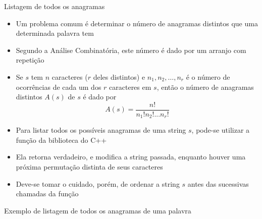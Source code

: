 \begin{frame}[fragile]{Listagem de todos os anagramas}

    \begin{itemize}
        \item Um problema comum é determinar o número de anagramas distintos que uma determinada 
            palavra tem

        \item Segundo a Análise Combinatória, este número é dado por um arranjo com repetição

        \item Se $s$ tem $n$ caracteres ($r$ deles distintos) e $n_1, n_2, \ldots, n_r$ é o número 
            de ocorrências de cada um dos $r$ caracteres em $s$, então o número de anagramas 
            distintos $A(s)$ de $s$ é dado por
            \[
                A(s) = \frac{n!}{n_1!n_2!...n_r!}
            \]

        \item Para listar todos os possíveis anagramas de uma string $s$, pode-se utilizar a 
            função  da biblioteca  do C++

        \item Ela retorna verdadeiro, e modifica a string passada, enquanto houver uma próxima 
            permutação distinta de seus caracteres

        \item Deve-se tomar o cuidado, porém, de ordenar a string $s$ antes das sucessivas 
            chamadas da função 
    \end{itemize}

\end{frame}

\begin{frame}[fragile]{Exemplo de listagem de todos os anagramas de uma palavra}
\end{frame}

